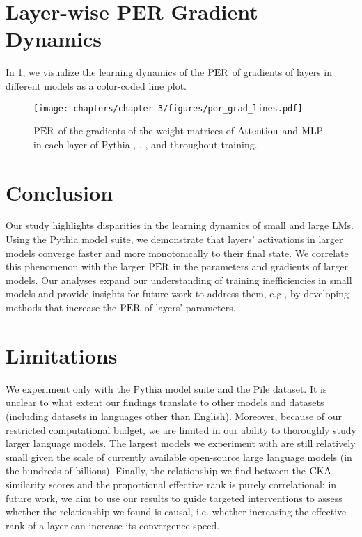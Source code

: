 \section{Layer-wise PER Gradient Dynamics}
\label{app:layerwise-per_grad-figures}

In \cref{fig:per_grad-layer-wise-lines}, we visualize the learning dynamics of the $\mathrm{PER}$ of gradients of layers in different models as a color-coded line plot. 
\vspace{0.2cm}

\begin{figure*}[h!]
    \centering
    \texttt{[image: chapters/chapter 3/figures/per\_grad\_lines.pdf]}
    \vspace{-5pt}
    \caption{$\mathrm{PER}$ of the gradients of the weight matrices of $\mathrm{Attention}$ and $\mathrm{MLP}$ in each layer of Pythia , , ,  and  throughout training.}%
    \label{fig:per_grad-layer-wise-lines}
\end{figure*}


\section{Conclusion}\label{sec:conclusion}

Our study highlights disparities in the learning dynamics of small and large LMs. Using the Pythia model suite, we demonstrate that layers' activations in larger models converge faster and more monotonically to their final state.
We correlate this phenomenon with the larger $\mathrm{PER}$ in the parameters and gradients of larger models. 
Our analyses expand our understanding of training inefficiencies in small models and provide insights for future work to address them, e.g., by developing methods that increase the $\mathrm{PER}$ of layers’ parameters.

\section*{Limitations}\label{sec:limitations}

We experiment only with the Pythia model suite and the Pile dataset. It is unclear to what extent our findings translate to other models and datasets (including datasets in languages other than English). Moreover, because of our restricted computational budget, we are limited in our ability to thoroughly study larger language models. 
The largest models we experiment with are still relatively small given the scale of currently available open-source large language models (in the hundreds of billions). Finally, the relationship we find between the $\mathrm{CKA}$ similarity scores and the proportional effective rank is purely correlational: in future work, we aim to use our results to guide targeted interventions to assess whether the relationship we found is causal, i.e. whether increasing the effective rank of a layer can increase its convergence speed.